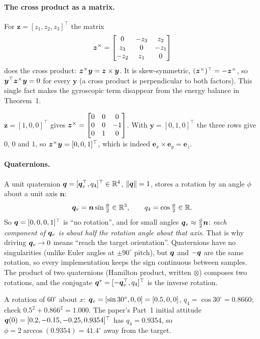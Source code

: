 \paragraph{The cross product as a matrix.} For $\bm z=[z_1,z_2,z_3]^\top$ the matrix
\begin{equation}\label{eq:skew}
\bm z^{\times}=\begin{bmatrix}0&-z_3&z_2\\ z_3&0&-z_1\\ -z_2&z_1&0\end{bmatrix}
\end{equation}
does the cross product: $\bm z^{\times}\bm y=\bm z\times\bm y$. It is skew-symmetric, $(\bm z^{\times})^\top=-\bm z^{\times}$, so
$\bm y^\top\bm z^{\times}\bm y=0$ for every $\bm y$ (a cross product is perpendicular to both factors). This single fact
makes the gyroscopic term disappear from the energy balance in Theorem~1.
\begin{toybox}
$\bm z=[1,0,0]^\top$ gives $\bm z^{\times}=\begin{bmatrix}0&0&0\\0&0&-1\\0&1&0\end{bmatrix}$. With $\bm y=[0,1,0]^\top$ the three rows
give $0$, $0$ and $1$, so $\bm z^{\times}\bm y=[0,0,1]^\top$, which is indeed $\bm e_x\times\bm e_y=\bm e_z$.
\end{toybox}

\paragraph{Quaternions.} A unit quaternion $\bm{q}=[\bm{q}_v^\top,q_4]^\top\in\mathbb{R}^4$, $\|\bm{q}\|=1$, stores a rotation by an angle
$\phi$ about a unit axis $\bm n$:
\begin{equation}\label{eq:quat}
\bm{q}_v=\bm n\sin\tfrac{\phi}{2}\in\mathbb{R}^3,\qquad q_4=\cos\tfrac{\phi}{2}\in\mathbb{R} .
\end{equation}
So $\bm{q}=[0,0,0,1]^\top$ is ``no rotation'', and for small angles $\bm{q}_v\approx\tfrac{\phi}{2}\bm n$: \emph{each component of
$\bm{q}_v$ is about half the rotation angle about that axis}. That is why driving $\bm{q}_v\to0$ means ``reach the target
orientation''. Quaternions have no singularities (unlike Euler angles at $\pm90^\circ$ pitch), but $\bm{q}$ and $-\bm{q}$ are
the same rotation, so every implementation keeps the sign continuous between samples. The product of two quaternions
(Hamilton product, written $\otimes$) composes two rotations, and the conjugate $\bm{q}^*=[-\bm{q}_v^\top,q_4]^\top$ is the
inverse rotation.
\begin{toybox}
A rotation of $60^\circ$ about $x$: $\bm{q}_v=[\sin30^\circ,0,0]=[0.5,0,0]$, $q_4=\cos30^\circ=0.8660$; check
$0.5^2+0.866^2=1.000$. The paper's Part~1 initial attitude $\bm{q}(0)=[0.2,-0.15,-0.25,0.9354]^\top$ has $q_4=0.9354$, so
$\phi=2\arccos(0.9354)=41.4^\circ$ away from the target.
\end{toybox}

